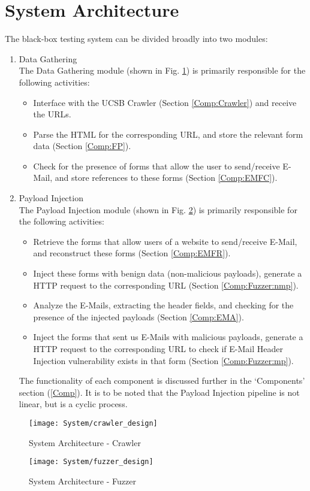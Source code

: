 \section{System Architecture}
\label{sys:arch}
The black-box testing system can be divided broadly into two modules:
\begin{enumerate}
	\item Data Gathering\\
		The Data Gathering module (shown in Fig. \ref{fig:crawler}) is primarily responsible for the following activities:
		\begin{itemize}
			\item Interface with the UCSB Crawler (Section \ref{Comp:Crawler}) and receive the URLs.
			\item Parse the HTML for the corresponding URL, and store the relevant form data (Section \ref{Comp:FP}).
			\item Check for the presence of forms that allow the user to send/receive E-Mail, and store references to these forms (Section \ref{Comp:EMFC}).
		\end{itemize} 
	\item Payload Injection\\
		The Payload Injection module (shown in Fig. \ref{fig:fuzzer}) is primarily responsible for the following activities:
		\begin{itemize}
			\item Retrieve the forms that allow users of a website to send/receive E-Mail, and reconstruct these forms (Section \ref{Comp:EMFR}).
			\item Inject these forms with benign data (non-malicious payloads), generate a HTTP request to the corresponding URL (Section \ref{Comp:Fuzzer:nmp}).
			\item Analyze the E-Mails, extracting the header fields, and checking for the presence of the injected payloads (Section \ref{Comp:EMA}).
			\item Inject the forms that sent us E-Mails with malicious payloads, generate a HTTP request to the corresponding URL to check if E-Mail Header Injection vulnerability exists in that form (Section \ref{Comp:Fuzzer:mp}).
		\end{itemize} 
	The functionality of each component is discussed further in the `Components' section (\ref{Comp}). It is to be noted that the Payload Injection pipeline is not linear, but is a cyclic process.
\end{enumerate}

\begin{figure}
     \centering
     \texttt{[image: System/crawler\_design]}
     \caption{System Architecture - Crawler}
     \label{fig:crawler}
 \end{figure}
 
 
 \begin{figure}
 	\centering
 	\texttt{[image: System/fuzzer\_design]}
 	\caption{System Architecture - Fuzzer}
 	\label{fig:fuzzer}
 \end{figure}
 